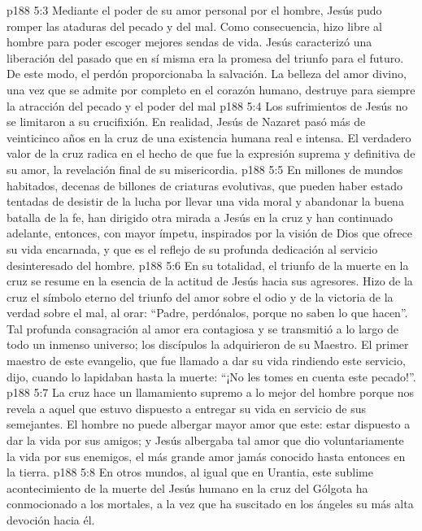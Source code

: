 \vs p188 5:3 Mediante el poder de su amor personal por el hombre, Jesús pudo romper las ataduras del pecado y del mal. Como consecuencia, hizo libre al hombre para poder escoger mejores sendas de vida. Jesús caracterizó una liberación del pasado que en sí misma era la promesa del triunfo para el futuro. De este modo, el perdón proporcionaba la salvación. La belleza del amor divino, una vez que se admite por completo en el corazón humano, destruye para siempre la atracción del pecado y el poder del mal
\vs p188 5:4 \pc Los sufrimientos de Jesús no se limitaron a su crucifixión. En realidad, Jesús de Nazaret pasó más de veinticinco años en la cruz de una existencia humana real e intensa. El verdadero valor de la cruz radica en el hecho de que fue la expresión suprema y definitiva de su amor, la revelación final de su misericordia.
\vs p188 5:5 \pc En millones de mundos habitados, decenas de billones de criaturas evolutivas, que pueden haber estado tentadas de desistir de la lucha por llevar una vida moral y abandonar la buena batalla de la fe, han dirigido otra mirada a Jesús en la cruz y han continuado adelante, entonces, con mayor ímpetu, inspirados por la visión de Dios que ofrece su vida encarnada, y que es el reflejo de su profunda dedicación al servicio desinteresado del hombre.
\vs p188 5:6 En su totalidad, el triunfo de la muerte en la cruz se resume en la esencia de la actitud de Jesús hacia sus agresores. Hizo de la cruz el símbolo eterno del triunfo del amor sobre el odio y de la victoria de la verdad sobre el mal, al orar: “Padre, perdónalos, porque no saben lo que hacen”. Tal profunda consagración al amor era contagiosa y se transmitió a lo largo de todo un inmenso universo; los discípulos la adquirieron de su Maestro. El primer maestro de este evangelio, que fue llamado a dar su vida rindiendo este servicio, dijo, cuando lo lapidaban hasta la muerte: “¡No les tomes en cuenta este pecado!”.
\vs p188 5:7 La cruz hace un llamamiento supremo a lo mejor del hombre porque nos revela a aquel que estuvo dispuesto a entregar su vida en servicio de sus semejantes. El hombre no puede albergar mayor amor que este: estar dispuesto a dar la vida por sus amigos; y Jesús albergaba tal amor que dio voluntariamente la vida por sus enemigos, el más grande amor jamás conocido hasta entonces en la tierra.
\vs p188 5:8 En otros mundos, al igual que en Urantia, este sublime acontecimiento de la muerte del Jesús humano en la cruz del Gólgota ha conmocionado a los mortales, a la vez que ha suscitado en los ángeles su más alta devoción hacia él.
